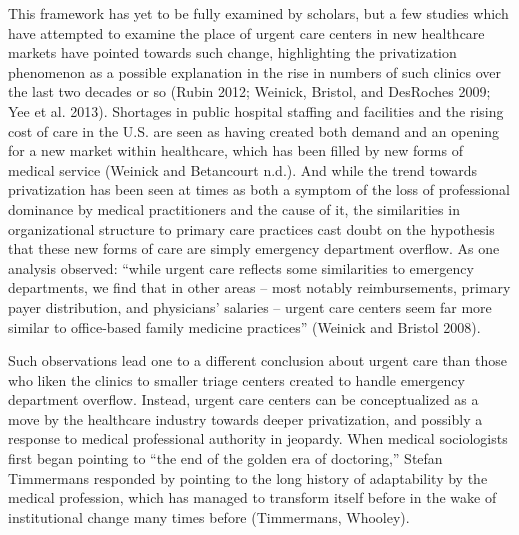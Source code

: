 \documentclass[12pt,twoside]{reedthesis}
\begin{document}
  This framework has yet to be fully examined by scholars, but a few
  studies which have attempted to examine the place of urgent care centers
  in new healthcare markets have pointed towards such change, highlighting
  the privatization phenomenon as a possible explanation in the rise in
  numbers of such clinics over the last two decades or so (Rubin 2012;
  Weinick, Bristol, and DesRoches 2009; Yee et al. 2013). Shortages in
  public hospital staffing and facilities and the rising cost of care in
  the U.S. are seen as having created both demand and an opening for a new
  market within healthcare, which has been filled by new forms of medical
  service (Weinick and Betancourt n.d.). And while the trend towards
  privatization has been seen at times as both a symptom of the loss of
  professional dominance by medical practitioners and the cause of it, the
  similarities in organizational structure to primary care practices cast
  doubt on the hypothesis that these new forms of care are simply
  emergency department overflow. As one analysis observed: ``while urgent
  care reflects some similarities to emergency departments, we find that
  in other areas -- most notably reimbursements, primary payer
  distribution, and physicians' salaries -- urgent care centers seem far
  more similar to office-based family medicine practices'' (Weinick and
  Bristol 2008).
  
  Such observations lead one to a different conclusion about urgent care
  than those who liken the clinics to smaller triage centers created to
  handle emergency department overflow. Instead, urgent care centers can
  be conceptualized as a move by the healthcare industry towards deeper
  privatization, and possibly a response to medical professional authority
  in jeopardy. When medical sociologists first began pointing to ``the end
  of the golden era of doctoring,'' Stefan Timmermans responded by
  pointing to the long history of adaptability by the medical profession,
  which has managed to transform itself before in the wake of
  institutional change many times before (Timmermans, Whooley).
  
\end{document}
